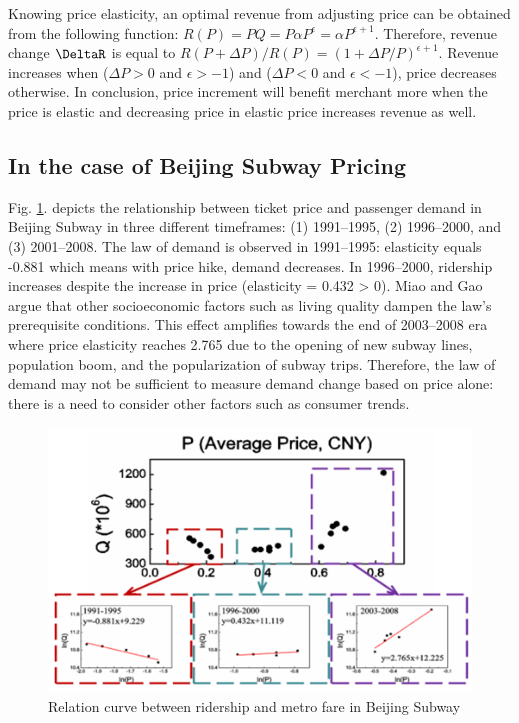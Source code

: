 \documentclass[a4paper,12pt,oneside, utf8x]{report}
\begin{document}
Knowing price elasticity, an optimal revenue from adjusting price can be obtained from the following function: $R(P) = PQ = P\alpha P^\epsilon= \alpha P^{\epsilon+1}$. Therefore, revenue change $\DeltaR$ is equal to $R(P+\Delta P)/R(P) = (1+ \Delta P/P)^{\epsilon+1}$. Revenue increases when ($\Delta P > 0$ and $\epsilon > -1$) and ($\Delta P < 0$ and $\epsilon < -1$), price decreases otherwise. In conclusion, price increment will benefit merchant more when the price is elastic and decreasing price in elastic price increases revenue as well.

\subsection{In the case of Beijing Subway Pricing}
Fig. \ref{f26}. depicts the relationship between ticket price and passenger demand in Beijing Subway in three different timeframes: (1) 1991–1995, (2) 1996–2000, and (3) 2001–2008. The law of demand is observed in 1991–1995: elasticity equals -0.881 which means with price hike, demand decreases. In 1996–2000, ridership increases despite the increase in price (elasticity = 0.432 > 0). Miao and Gao argue that other socioeconomic factors such as living quality dampen the law’s prerequisite conditions. This effect amplifies towards the end of 2003–2008 era where price elasticity reaches 2.765 due to the opening of new subway lines, population boom, and the popularization of subway trips. Therefore, the law of demand may not be sufficient to measure demand change based on price alone: there is a need to consider other factors such as consumer trends.

    \begin{figure}[H]
        \centering
        \includegraphics[width=.96\textwidth]{figures/2-6.png}
        \caption{Relation curve between ridership and metro fare in Beijing Subway \cite{a19}}
        \label{f26}
    \end{figure}
\end{document}

